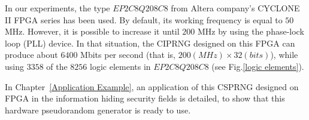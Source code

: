 In our experiments, the type $EP2C8Q208C8$ from Altera 
company's CYCLONE II FPGA series 
has been used. By default, its working
frequency is equal to $50$ MHz.
However, it is possible to increase it until
$200$ MHz by using the phase-lock loop (PLL) device.
In that situation, the CIPRNG designed on this
FPGA can produce about $6400$ Mbits per second
(that is, $200 (MHz) \times 32 (bits)$),
while using $3358$ of the $8256$ logic 
elements in $EP2C8Q208C8$ (see
Fig.\ref{logic elements}). 

In Chapter~\ref{Application Example}, an application of this 
CSPRNG designed on FPGA in the information 
hiding security fields is detailed, to show
that this hardware pseudorandom generator 
is ready to use.
